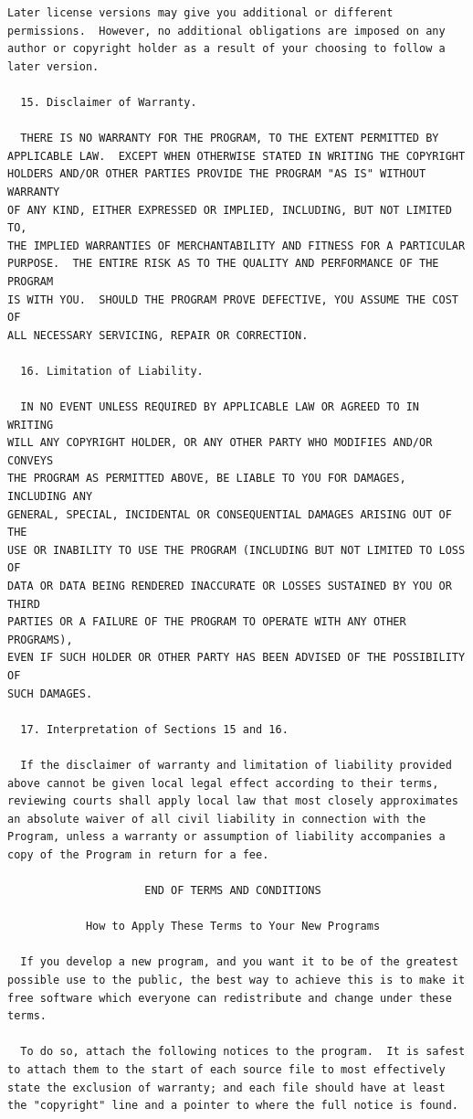 \documentclass[letterpaper,10pt,english]{sphinxmanual}
\begin{document}
\begin{Verbatim}[commandchars=\\\{\}]
  Later license versions may give you additional or different
permissions.  However, no additional obligations are imposed on any
author or copyright holder as a result of your choosing to follow a
later version.

  15. Disclaimer of Warranty.

  THERE IS NO WARRANTY FOR THE PROGRAM, TO THE EXTENT PERMITTED BY
APPLICABLE LAW.  EXCEPT WHEN OTHERWISE STATED IN WRITING THE COPYRIGHT
HOLDERS AND/OR OTHER PARTIES PROVIDE THE PROGRAM "AS IS" WITHOUT WARRANTY
OF ANY KIND, EITHER EXPRESSED OR IMPLIED, INCLUDING, BUT NOT LIMITED TO,
THE IMPLIED WARRANTIES OF MERCHANTABILITY AND FITNESS FOR A PARTICULAR
PURPOSE.  THE ENTIRE RISK AS TO THE QUALITY AND PERFORMANCE OF THE PROGRAM
IS WITH YOU.  SHOULD THE PROGRAM PROVE DEFECTIVE, YOU ASSUME THE COST OF
ALL NECESSARY SERVICING, REPAIR OR CORRECTION.

  16. Limitation of Liability.

  IN NO EVENT UNLESS REQUIRED BY APPLICABLE LAW OR AGREED TO IN WRITING
WILL ANY COPYRIGHT HOLDER, OR ANY OTHER PARTY WHO MODIFIES AND/OR CONVEYS
THE PROGRAM AS PERMITTED ABOVE, BE LIABLE TO YOU FOR DAMAGES, INCLUDING ANY
GENERAL, SPECIAL, INCIDENTAL OR CONSEQUENTIAL DAMAGES ARISING OUT OF THE
USE OR INABILITY TO USE THE PROGRAM (INCLUDING BUT NOT LIMITED TO LOSS OF
DATA OR DATA BEING RENDERED INACCURATE OR LOSSES SUSTAINED BY YOU OR THIRD
PARTIES OR A FAILURE OF THE PROGRAM TO OPERATE WITH ANY OTHER PROGRAMS),
EVEN IF SUCH HOLDER OR OTHER PARTY HAS BEEN ADVISED OF THE POSSIBILITY OF
SUCH DAMAGES.

  17. Interpretation of Sections 15 and 16.

  If the disclaimer of warranty and limitation of liability provided
above cannot be given local legal effect according to their terms,
reviewing courts shall apply local law that most closely approximates
an absolute waiver of all civil liability in connection with the
Program, unless a warranty or assumption of liability accompanies a
copy of the Program in return for a fee.

                     END OF TERMS AND CONDITIONS

            How to Apply These Terms to Your New Programs

  If you develop a new program, and you want it to be of the greatest
possible use to the public, the best way to achieve this is to make it
free software which everyone can redistribute and change under these terms.

  To do so, attach the following notices to the program.  It is safest
to attach them to the start of each source file to most effectively
state the exclusion of warranty; and each file should have at least
the "copyright" line and a pointer to where the full notice is found.


\end{Verbatim}
\end{document}
